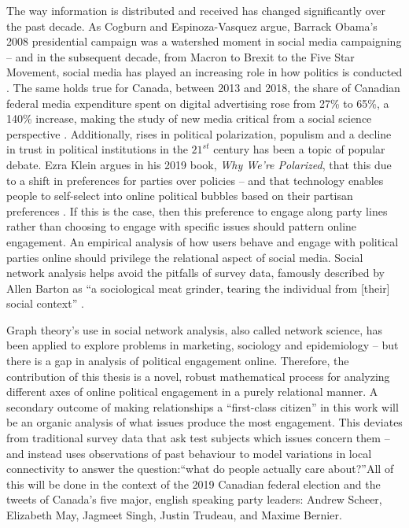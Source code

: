 The way information is distributed and received has changed significantly over
the past decade. As Cogburn and Espinoza-Vasquez argue, Barrack Obama’s 2008
presidential campaign was a watershed moment in social media campaigning -- and
in the subsequent decade, from Macron to Brexit to the Five Star Movement,
social media has played an increasing role in how politics is conducted
\cite{cogburn2011networked}. The same holds true for Canada, between 2013 and
2018, the share of Canadian federal media expenditure spent on digital
advertising rose from 27\% to 65\%, a 140\% increase, making the study of new
media critical from a social science perspective
\cite{annualReportCanadaAdvertisingActivities_2018}. Additionally, rises in
political polarization, populism and a decline in trust in political
institutions in the $21^{st}$ century has been a topic of popular debate. Ezra
Klein argues in his 2019 book, \emph{Why We're Polarized}, that this due to a
shift in preferences for parties over policies -- and that technology enables
people to self-select into online political bubbles based on their partisan
preferences \cite{levitsky2018democracies}. If this is the case, then this
preference to engage along party lines rather than choosing to engage with
specific issues should pattern online engagement. An empirical analysis of how
users behave and engage with political parties online should privilege the
relational aspect of social media. Social network analysis helps avoid the
pitfalls of survey data, famously described by Allen Barton as ``a sociological
meat grinder, tearing the individual from [their] social context''
\cite{freeman2004development}.

Graph theory’s use in social network analysis, also called network science, has
been applied to explore problems in marketing, sociology and epidemiology -- but
there is a gap in analysis of political engagement online. Therefore, the
contribution of this thesis is a novel, robust mathematical process for
analyzing different axes of online political engagement in a purely relational
manner. A secondary outcome of making relationships a “first-class citizen” in
this work will be an organic analysis of what issues produce the most
engagement. This deviates from traditional survey data that ask test subjects
which issues concern them -- and instead uses observations of past behaviour to
model variations in local connectivity to answer the question:“what do people
actually care about?”All of this will be done in the context of the 2019
Canadian federal election and the tweets of Canada's five major, english
speaking party leaders: Andrew Scheer, Elizabeth May, Jagmeet Singh, Justin
Trudeau, and Maxime Bernier. 

